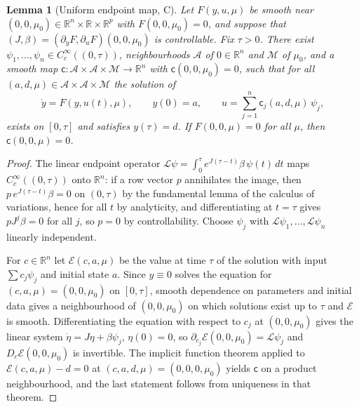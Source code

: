 \documentclass[11pt,a4paper]{article}
\theoremstyle{plain}
\newtheorem{lemma}[theorem]{Lemma}
\theoremstyle{definition}
\theoremstyle{remark}
\newcommand{\R}{\mathbb R}
\newcommand{\cL}{\mathcal L}
\newcommand{\cE}{\mathcal E}
\newcommand{\evC}{\textsf{C}}
\begin{document}
\begin{lemma}[Uniform endpoint map, \evC]\label{lem:endpoint}
Let $F(y,u,\mu)$ be smooth near $(0,0,\mu_0)\in\R^n\times\R\times\R^p$ with $F(0,0,\mu_0)=0$, and suppose that $(J,\beta)=(\partial_yF,\partial_uF)(0,0,\mu_0)$ is controllable. Fix $\tau>0$. There exist $\psi_1,\dots,\psi_n\in C_c^\infty((0,\tau))$, neighbourhoods $\mathcal A$ of $0\in\R^n$ and $\mathcal M$ of $\mu_0$, and a smooth map $\mathsf c\colon\mathcal A\times\mathcal A\times\mathcal M\to\R^n$ with $\mathsf c(0,0,\mu_0)=0$, such that for all $(a,d,\mu)\in\mathcal A\times\mathcal A\times\mathcal M$ the solution of
\[
\dot y=F(y,u(t),\mu),\qquad y(0)=a,\qquad u=\sum_{j=1}^n\mathsf c_j(a,d,\mu)\,\psi_j,
\]
exists on $[0,\tau]$ and satisfies $y(\tau)=d$. If $F(0,0,\mu)=0$ for all $\mu$, then $\mathsf c(0,0,\mu)=0$.
\end{lemma}
\begin{proof}
The linear endpoint operator $\cL\psi=\int_0^\tau e^{J(\tau-t)}\beta\,\psi(t)\,dt$ maps $C_c^\infty((0,\tau))$ onto $\R^n$: if a row vector $p$ annihilates the image, then $p\,e^{J(\tau-t)}\beta=0$ on $(0,\tau)$ by the fundamental lemma of the calculus of variations, hence for all $t$ by analyticity, and differentiating at $t=\tau$ gives $pJ^j\beta=0$ for all $j$, so $p=0$ by controllability. Choose $\psi_j$ with $\cL\psi_1,\dots,\cL\psi_n$ linearly independent.

For $c\in\R^n$ let $\cE(c,a,\mu)$ be the value at time $\tau$ of the solution with input $\sum c_j\psi_j$ and initial state $a$. Since $y\equiv0$ solves the equation for $(c,a,\mu)=(0,0,\mu_0)$ on $[0,\tau]$, smooth dependence on parameters and initial data gives a neighbourhood of $(0,0,\mu_0)$ on which solutions exist up to $\tau$ and $\cE$ is smooth. Differentiating the equation with respect to $c_j$ at $(0,0,\mu_0)$ gives the linear system $\dot\eta=J\eta+\beta\psi_j$, $\eta(0)=0$, so $\partial_{c_j}\cE(0,0,\mu_0)=\cL\psi_j$ and $D_c\cE(0,0,\mu_0)$ is invertible. The implicit function theorem applied to $\cE(c,a,\mu)-d=0$ at $(c,a,d,\mu)=(0,0,0,\mu_0)$ yields $\mathsf c$ on a product neighbourhood, and the last statement follows from uniqueness in that theorem.
\end{proof}
\end{document}
